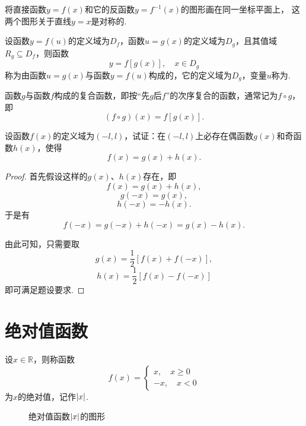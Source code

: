 \begin{property}
将直接函数\(y=f(x)\)和它的反函数\(y=f^{-1}(x)\)的图形画在同一坐标平面上，
这两个图形关于直线\(y=x\)是对称的.
\end{property}

\begin{definition}
设函数\(y=f(u)\)的定义域为\(D_f\)，函数\(u=g(x)\)的定义域为\(D_g\)，且其值域\(R_g \subseteq D_f\)，则函数\[
y = f[g(x)],
\quad x \in D_g
\]称为由函数\(u=g(x)\)与函数\(y=f(u)\)构成的，它的定义域为\(D_g\)，变量\(u\)称为.

函数\(g\)与函数\(f\)构成的复合函数，即按“先\(g\)后\(f\)”的次序复合的函数，通常记为\(f \circ g\)，即\[
(f \circ g)(x) = f[g(x)].
\]
\end{definition}

\begin{example}
设函数\(f(x)\)的定义域为\((-l,l)\)，试证：在\((-l,l)\)上必存在偶函数\(g(x)\)和奇函数\(h(x)\)，使得\[
f(x) = g(x)+h(x).
\]
\begin{proof}
首先假设这样的\(g(x)\)、\(h(x)\)存在，即\[
f(x) = g(x) + h(x),
\]\[
g(-x) = g(x),
\]\[
h(-x) = -h(x).
\]于是有\[
f(-x) = g(-x) + h(-x) = g(x) - h(x).
\]

由此可知，只需要取\[
g(x) = \frac{1}{2} [f(x) + f(-x)],
\]\[
h(x) = \frac{1}{2} [f(x) - f(-x)]
\]即可满足题设要求.
\end{proof}
\end{example}

\section{绝对值函数}
\begin{definition}[绝对值]
设\(x \in \mathbb{R}\)，则称函数\[
f(x) = \left\{ \begin{array}{c}
x, \quad x \geq 0 \\
-x, \quad x < 0
\end{array} \right.
\]为\(x\)的绝对值，记作\(\abs{x}\).
\end{definition}

\begin{figure}[ht]
\centering
{}
\caption{绝对值函数\(\abs{x}\)的图形}
\end{figure}


